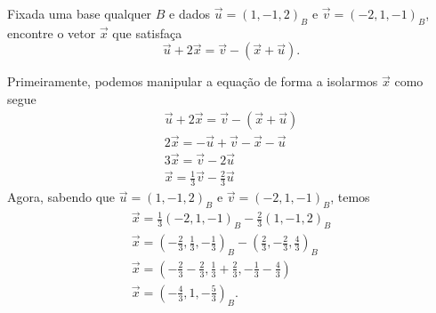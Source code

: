 \begin{exeresol}
  Fixada uma base qualquer $B$ e dados $\vec{u}=(1,-1,2)_B$ e $\vec{v}=(-2,1,-1)_B$, encontre o vetor $\vec{x}$ que satisfaça
  \begin{equation}
    \vec{u}+2\vec{x}=\vec{v}-\left(\vec{x}+\vec{u}\right).
  \end{equation}
\end{exeresol}
\begin{resol}
  Primeiramente, podemos manipular a equação de forma a isolarmos $\vec{x}$ como segue
  \begin{gather}
    \vec{u}+2\vec{x}=\vec{v}-\left(\vec{x}+\vec{u}\right)\\
    2\vec{x}=-\vec{u}+\vec{v}-\vec{x}-\vec{u}\\
    3\vec{x}=\vec{v}-2\vec{u}\\
    \vec{x}=\frac{1}{3}\vec{v}-\frac{2}{3}\vec{u}
  \end{gather}
  Agora, sabendo que $\vec{u}=(1,-1,2)_B$ e $\vec{v}=(-2,1,-1)_B$, temos
  \begin{gather}
    \vec{x}=\frac{1}{3}(-2,1,-1)_B-\frac{2}{3}(1,-1,2)_B\\
    \vec{x}=\left(-\frac{2}{3},\frac{1}{3},-\frac{1}{3}\right)_B-\left(\frac{2}{3},-\frac{2}{3},\frac{4}{3}\right)_B\\
    \vec{x}=\left(-\frac{2}{3}-\frac{2}{3},\frac{1}{3}+\frac{2}{3},-\frac{1}{3}-\frac{4}{3}\right)\\
    \vec{x}=\left(-\frac{4}{3},1,-\frac{5}{3}\right)_B.
  \end{gather}
\end{resol}

